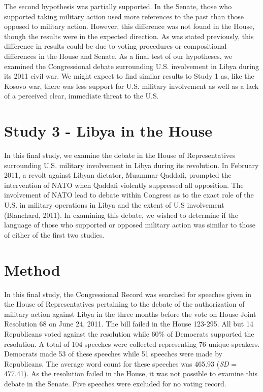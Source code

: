 \documentclass[english,man]{apa6}
\theoremstyle{definition}
\theoremstyle{definition}
\theoremstyle{definition}
\theoremstyle{remark}
\begin{document}
The second hypothesis was partially supported. In the Senate, those who
supported taking military action used more references to the past than
those opposed to military action. However, this difference was not found
in the House, though the results were in the expected direction. As was
stated previously, this difference in results could be due to voting
procedures or compositional differences in the House and Senate. As a
final test of our hypotheses, we examined the Congressional debate
surrounding U.S. involvement in Libya during its 2011 civil war. We
might expect to find similar results to Study 1 as, like the Kosovo war,
there was less support for U.S. military involvement as well as a lack
of a perceived clear, immediate threat to the U.S.

\section{Study 3 - Libya in the
House}\label{study-3---libya-in-the-house}

In this final study, we examine the debate in the House of
Representatives surrounding U.S. military involvement in Libya during
its revolution. In February 2011, a revolt against Libyan dictator,
Muammar Qaddafi, prompted the intervention of NATO when Qaddafi
violently suppressed all opposition. The involvement of NATO lead to
debate within Congress as to the exact role of the U.S. in military
operations in Libya and the extent of U.S involvement (Blanchard, 2011).
In examining this debate, we wished to determine if the language of
those who supported or opposed military action was similar to those of
either of the first two studies.

\section{Method}\label{method-5}

In this final study, the Congressional Record was searched for speeches
given in the House of Representatives pertaining to the debate of the
authorization of military action against Libya in the three months
before the vote on House Joint Resolution 68 on June 24, 2011. The bill
failed in the House 123-295. All but 14 Republicans voted against the
resolution while 60\% of Democrats supported the resolution. A total of
104 speeches were collected representing 76 unique speakers. Democrats
made 53 of these speeches while 51 speeches were made by Republicans.
The average word count for these speeches was 465.93 (\emph{SD} =
477.41). As the resolution failed in the House, it was not possible to
examine this debate in the Senate. Five speeches were excluded for no
voting record.
\end{document}
